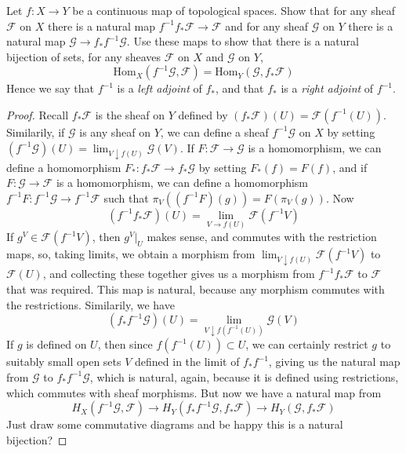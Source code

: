 \begin{theorem}
    Let $f:X \to Y$ be a continuous map of topological spaces. Show that for any sheaf $\mathcal{F}$ on $X$ there is a natural map $f^{-1}f_* \mathcal{F} \to \mathcal{F}$ and for any sheaf $\mathcal{G}$ on $Y$ there is a natural map $\mathcal{G} \to f_* f^{-1} \mathcal{G}$. Use these maps to show that there is a natural bijection of sets, for any sheaves $\mathcal{F}$ on $X$ and $\mathcal{G}$ on $Y$,
    \[ \text{Hom}_X(f^{-1}\mathcal{G}, \mathcal{F}) = \text{Hom}_Y(\mathcal{G}, f_* \mathcal{F}) \]
    Hence we say that $f^{-1}$ is a {\it left adjoint} of $f_*$, and that $f_*$ is a {\it right adjoint} of $f^{-1}$.
\end{theorem}
\begin{proof}
    Recall $f_* \mathcal{F}$ is the sheaf on $Y$ defined by $(f_* \mathcal{F})(U) = \mathcal{F}(f^{-1}(U))$. Similarily, if $\mathcal{G}$ is any sheaf on $Y$, we can define a sheaf $f^{-1} \mathcal{G}$ on $X$ by setting $(f^{-1} \mathcal{G})(U) = \lim_{V \downarrow f(U)} \mathcal{G}(V)$. If $F: \mathcal{F} \to \mathcal{G}$ is a homomorphism, we can define a homomorphism $F_*: f_* \mathcal{F} \to f_* \mathcal{G}$ by setting $F_*(f) = F(f)$, and if $F: \mathcal{G} \to \mathcal{F}$ is a homomorphism, we can define a homomorphism $f^{-1}F: f^{-1} \mathcal{G} \to f^{-1} \mathcal{F}$ such that $\pi_V((f^{-1} F)(g)) = F(\pi_V (g))$. Now
    \[ (f^{-1} f_* \mathcal{F})(U) = \lim_{V \to f(U)} \mathcal{F}(f^{-1} V) \]
    If $g^V \in \mathcal{F}(f^{-1} V)$, then $g^V|_U$ makes sense, and commutes with the restriction maps, so, taking limits, we obtain a morphism from $\lim_{V \downarrow f(U)} \mathcal{F}(f^{-1} V)$ to $\mathcal{F}(U)$, and collecting these together gives us a morphism from $f^{-1}f_* \mathcal{F}$ to $\mathcal{F}$ that was required. This map is natural, because any morphism commutes with the restrictions. Similarily, we have
    \[ (f_* f^{-1} \mathcal{G})(U) = \lim_{V \downarrow f(f^{-1}(U))} \mathcal{G}(V) \]
    If $g$ is defined on $U$, then since $f(f^{-1}(U)) \subset U$, we can certainly restrict $g$ to suitably small open sets $V$ defined in the limit of $f_*f^{-1}$, giving us the natural map from $\mathcal{G}$ to $f_* f^{-1} \mathcal{G}$, which is natural, again, because it is defined using restrictions, which commutes with sheaf morphisms. But now we have a natural map from
    \[ H_X(f^{-1}\mathcal{G}, \mathcal{F}) \to H_Y(f_*f^{-1}\mathcal{G}, f_* \mathcal{F}) \to H_Y(\mathcal{G}, f_* \mathcal{F}) \]
    Just draw some commutative diagrams and be happy this is a natural bijection?
\end{proof}

